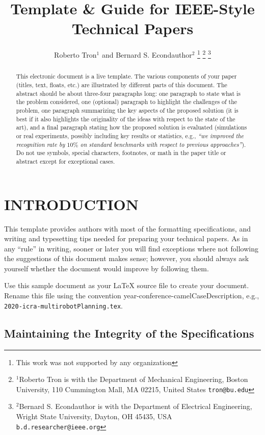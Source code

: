 \documentclass[letterpaper, 10 pt, conference]{ieeeconf}
\title{\LARGE \bf
Template \& Guide for IEEE-Style Technical Papers
}
\author{Roberto Tron$^{1}$ and Bernard S. Econdauthor$^{2}$%
\thanks{This work was not supported by any organization}%
\thanks{$^{1}$Roberto Tron is with the Department of Mechanical Engineering, 
        Boston University, 110 Cummington Mall, MA 02215, United States
        {\tt\small tron@bu.edu}}%
\thanks{$^{2}$Bernard S. Econdauthor is with the Department of Electrical Engineering, Wright State University,
        Dayton, OH 45435, USA
        {\tt\small b.d.researcher@ieee.org}}%
}
\begin{document}
\maketitle
\thispagestyle{empty}
\pagestyle{empty}


\begin{abstract}

  This electronic document is a live template. The various components of your paper (titles, text, floats, etc.) are illustrated by different parts of this document.
  The abstract should be about three-four paragraphs long: one paragraph to state what is the problem considered, one (optional) paragraph to highlight the challenges of the problem, one paragraph summarizing the key aspects of the proposed solution (it is best if it also highlights the originality of the ideas with respect to the state of the art), and a final paragraph stating how the proposed solution is evaluated (simulations or real experiments, possibly including key results or statistics, e.g., \emph{``we improved the recognition rate by $10\%$ on standard benchmarks with respect to previous approaches''}).
  Do not use symbols, special characters, footnotes, or math in the paper title or abstract except for exceptional cases.
\end{abstract}


\section{INTRODUCTION}

This template provides authors with most of the formatting specifications, and writing and typesetting tips needed for preparing your technical papers. 
As in any ``rule'' in writing, sooner or later you will find exceptions where not following the suggestions of this document makes sense; however, you should always ask yourself whether the document would improve by following them.

Use this sample document as your LaTeX source file to create your document. Rename this file using the convention year-conference-camelCaseDescription, e.g., \texttt{2020-icra-multirobotPlanning.tex}.

\subsection{Maintaining the Integrity of the Specifications}
\end{document}
